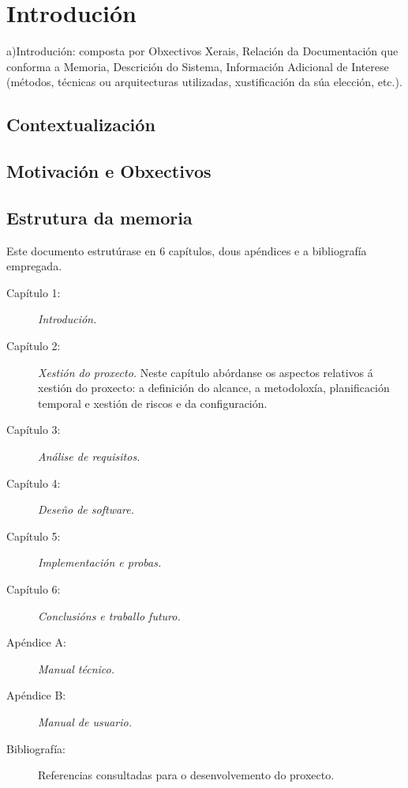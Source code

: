 \chapter{Introdución}
a)Introdución:  composta  por  Obxectivos  Xerais,  Relación  da  Documentación  que  conforma  a 
Memoria,  Descrición  do  Sistema,  Información  Adicional  de  Interese  (métodos,  técnicas  ou 
arquitecturas utilizadas, xustificación da súa elección, etc.). 
 
\section{Contextualización}
\section{Motivación e Obxectivos}
\section{Estrutura da memoria}

Este documento estrutúrase en 6 capítulos, dous apéndices e a bibliografía empregada.

\begin{description}
\item[Capítulo 1:] \textit{Introdución.}
\item[Capítulo 2:] \textit{Xestión do proxecto.} Neste capítulo abórdanse os aspectos relativos á xestión do proxecto: a definición do alcance, a metodoloxía, planificación temporal e xestión de riscos e da configuración.
\item[Capítulo 3:] \textit{Análise de requisitos.}
\item[Capítulo 4:] \textit{Deseño de software.}
\item[Capítulo 5:] \textit{Implementación e probas.}
\item[Capítulo 6:] \textit{Conclusións e traballo futuro.}
\item[Apéndice A:] \textit{Manual técnico.}
\item[Apéndice B:] \textit{Manual de usuario.}
\item[Bibliografía:] Referencias consultadas para o desenvolvemento do proxecto.
\end{description}
